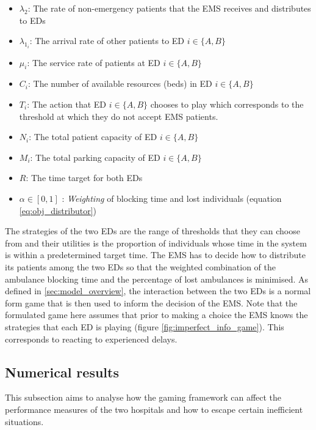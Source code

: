 \begin{itemize}
    \item \( \lambda_2 \): The rate of non-emergency patients that the EMS 
    receives and distributes to EDs
    \item \( \lambda_{1_i} \): The arrival rate of other patients to ED 
    \(i\in\{A, B\}\)
    \item \( \mu_i \): The service rate of patients at ED \(i\in\{A, B\}\)
    \item \( C_i \): The number of available resources (beds) in ED 
    \(i\in\{A, B\}\)  
    \item \( T_i \): The action that ED \(i\in\{A, B\} \) chooses to play which 
    corresponds to the threshold at which they do not accept EMS patients.
    \item \( N_i \): The total patient capacity of ED \(i\in\{A, B\} \)
    \item \( M_i \): The total parking capacity of ED \(i\in\{A, B\} \)
    \item \( R \): The time target for both EDs
    \item \( \alpha \in [0, 1] \) : \textit{Weighting} of blocking time and 
    lost individuals (equation \ref{eq:obj_distributor})
\end{itemize}

The strategies of the two EDs are the range of thresholds that they can choose
from and their utilities is the proportion of individuals whose time in the 
system is within a predetermined target time.
The EMS has to decide how to distribute its patients among the two EDs so that 
the weighted combination of the ambulance blocking time and the percentage of 
lost ambulances is minimised. 
As defined in \ref{sec:model_overview}, the interaction between the two EDs 
is a normal form game that is then used to inform the decision of the EMS.
Note that the formulated game here assumes that prior to making a choice the 
EMS knows the strategies that each ED is playing (figure 
\ref{fig:imperfect_info_game}). This corresponds to reacting to experienced 
delays.

\subsection{Numerical results}\label{sec:numerical_results}

This subsection aims to analyse how the gaming framework can affect the 
performance measures of the two hospitals and how to escape certain inefficient 
situations.


